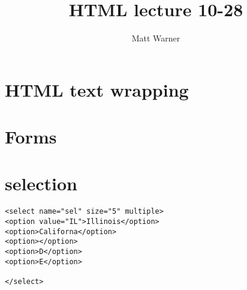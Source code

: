 \documentclass{report}
\title{\Huge{HTML lecture 10-28}}
\author{\huge{Matt Warner}}
\date{\huge{}}
\begin{document}
    \maketitle
\section{HTML text wrapping}
\section{Forms}
\section{selection}
\begin{verbatim}
<select name="sel" size="5" multiple>
<option value="IL">Illinois</option>
<option>Californa</option>
<option></option>
<option>D</option>
<option>E</option>

</select>
\end{verbatim}
\end{document}
